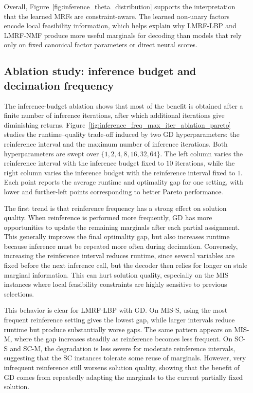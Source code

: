 Overall, Figure~\ref{fig:inference_theta_distribution} supports the interpretation that the learned MRFs are constraint-aware. The learned non-unary factors encode local feasibility information, which helps explain why LMRF-LBP and LMRF-NMF produce more useful marginals for decoding than models that rely only on fixed canonical factor parameters or direct neural scores.

\subsection{Ablation study: inference budget and decimation frequency}

The inference-budget ablation shows that most of the benefit is obtained after a finite number of inference iterations, after which additional iterations give diminishing returns. Figure~\ref{fig:inference_freq_max_iter_ablation_pareto} studies the runtime--quality trade-off induced by two GD hyperparameters: the reinference interval and the maximum number of inference iterations. Both hyperparameters are swept over $\{1,2,4,8,16,32,64\}$. The left column varies the reinference interval with the inference budget fixed to $10$ iterations, while the right column varies the inference budget with the reinference interval fixed to $1$. Each point reports the average runtime and optimality gap for one setting, with lower and further-left points corresponding to better Pareto performance.

The first trend is that reinference frequency has a strong effect on solution quality. When reinference is performed more frequently, GD has more opportunities to update the remaining marginals after each partial assignment. This generally improves the final optimality gap, but also increases runtime because inference must be repeated more often during decimation. Conversely, increasing the reinference interval reduces runtime, since several variables are fixed before the next inference call, but the decoder then relies for longer on stale marginal information. This can hurt solution quality, especially on the MIS instances where local feasibility constraints are highly sensitive to previous selections.

This behavior is clear for LMRF-LBP with GD. On MIS-S, using the most frequent reinference setting gives the lowest gap, while larger intervals reduce runtime but produce substantially worse gaps. The same pattern appears on MIS-M, where the gap increases steadily as reinference becomes less frequent. On SC-S and SC-M, the degradation is less severe for moderate reinference intervals, suggesting that the SC instances tolerate some reuse of marginals. However, very infrequent reinference still worsens solution quality, showing that the benefit of GD comes from repeatedly adapting the marginals to the current partially fixed solution.

